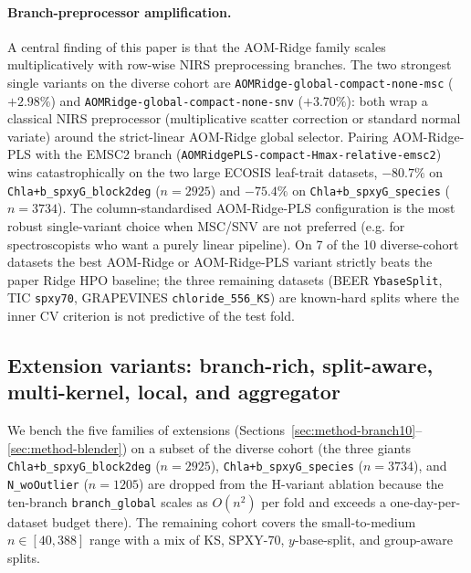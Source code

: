 \documentclass[11pt,a4paper]{article}
\begin{document}
\paragraph{Branch-preprocessor amplification.}
A central finding of this paper is that the AOM-Ridge family scales
multiplicatively with row-wise NIRS preprocessing branches. The two
strongest single variants on the diverse cohort are
\texttt{AOMRidge-global-compact-none-msc} ($+2.98\%$) and
\texttt{AOMRidge-global-compact-none-snv} ($+3.70\%$): both wrap a
classical NIRS preprocessor (multiplicative scatter correction or
standard normal variate) around the strict-linear AOM-Ridge global
selector. Pairing AOM-Ridge-PLS with the EMSC2 branch
(\texttt{AOMRidgePLS-compact-Hmax-relative-emsc2}) wins
catastrophically on the two large ECOSIS leaf-trait datasets,
$-80.7\%$ on \texttt{Chla+b\_spxyG\_block2deg} ($n=2925$) and
$-75.4\%$ on \texttt{Chla+b\_spxyG\_species} ($n=3734$). The
column-standardised AOM-Ridge-PLS configuration is the most robust
single-variant choice when MSC/SNV are not preferred (e.g. for
spectroscopists who want a purely linear pipeline). On 7 of the 10
diverse-cohort datasets the best AOM-Ridge or AOM-Ridge-PLS variant
strictly beats the paper Ridge HPO baseline; the three remaining
datasets (BEER \texttt{YbaseSplit}, TIC \texttt{spxy70},
GRAPEVINES \texttt{chloride\_556\_KS}) are known-hard splits where
the inner CV criterion is not predictive of the test fold.

\subsection{Extension variants: branch-rich, split-aware, multi-kernel,
            local, and aggregator}\label{sec:results-extensions}

We bench the five families of extensions
(Sections~\ref{sec:method-branch10}--\ref{sec:method-blender}) on a
subset of the diverse cohort (the three giants
\texttt{Chla+b\_spxyG\_block2deg} ($n=2925$),
\texttt{Chla+b\_spxyG\_species} ($n=3734$), and \texttt{N\_woOutlier}
($n=1205$) are dropped from the H-variant ablation because the
ten-branch \texttt{branch\_global} scales as $O(n^2)$ per fold and
exceeds a one-day-per-dataset budget there). The remaining cohort
covers the small-to-medium $n\!\in\![40,388]$ range with a mix of
KS, SPXY-70, $y$-base-split, and group-aware splits.
\end{document}
